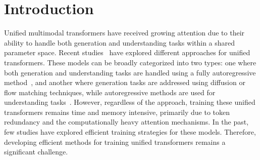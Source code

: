\section{Introduction}
\label{sec:intro}

Unified multimodal transformers have received growing attention due to their ability to handle both generation and understanding tasks within a shared parameter space. Recent studies~\cite{showo,team2024chameleon,seed-x,emu3,sun2023emu,x-vila,janusflow,transfusion,luminamgpt} have explored different approaches for unified transformers. These models can be broadly categorized into two types: one where both generation and understanding tasks are handled using a fully autoregressive method~\cite{seed-x,team2024chameleon,emu3}, and another where generation tasks are addressed using diffusion or flow matching techniques, while autoregressive methods are used for understanding tasks~\cite{showo,transfusion,janusflow}. However, regardless of the approach, training these unified transformers remains time and memory intensive, primarily due to token redundancy and the computationally heavy attention mechanisms. In the past, few studies have explored efficient training strategies for these models. Therefore, developing efficient methods for training unified transformers remains a significant challenge.



